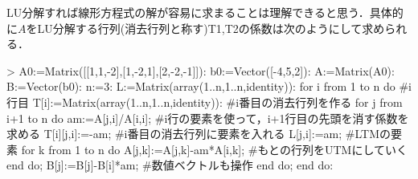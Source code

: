 LU分解すれば線形方程式の解が容易に求まることは理解できると思う．具体的に$A$をLU分解する行列(消去行列と称す)T1,T2の係数は次のようにして求められる．
\begin{MapleInput}
> A0:=Matrix([[1,1,-2],[1,-2,1],[2,-2,-1]]): 
  b0:=Vector([-4,5,2]):
  A:=Matrix(A0): B:=Vector(b0): n:=3: 
  L:=Matrix(array(1..n,1..n,identity)): 
  for i from 1 to n do #i行目
    T[i]:=Matrix(array(1..n,1..n,identity)): 
                            #i番目の消去行列を作る
    for j from i+1 to n do 
      am:=A[j,i]/A[i,i];    #i行の要素を使って，i+1行目の先頭を消す係数を求める
      T[i][j,i]:=-am;       #i番目の消去行列に要素を入れる
      L[j,i]:=am;           #LTMの要素
      for k from 1 to n do
        A[j,k]:=A[j,k]-am*A[i,k]; #もとの行列をUTMにしていく
      end do; 
      B[j]:=B[j]-B[i]*am;   #数値ベクトルも操作
    end do; 
  end do:
\end{MapleInput}
\begin{MapleOutput}
\end{MapleOutput}

